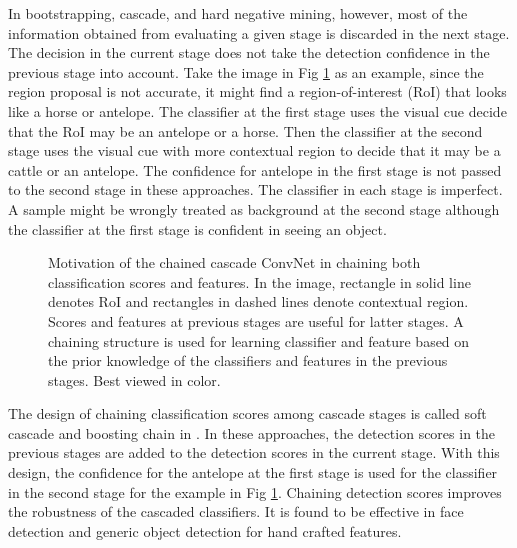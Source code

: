 \documentclass[10pt,twocolumn,letterpaper]{article}
\begin{document}
In bootstrapping, cascade, and hard negative mining, however, most of the information obtained from evaluating a given stage is discarded in the next stage. The decision in the current stage does not take the detection confidence in the previous stage into account. Take the image in Fig \ref{fig:overview} as an example, since the region proposal is not accurate, it might find a region-of-interest (RoI) that looks like a horse or antelope. The classifier at the first stage uses the visual cue decide that the RoI may be an antelope or a horse. Then the classifier at the second stage uses the visual cue with more contextual region to decide that it may be a cattle or an antelope. The confidence for antelope in the first stage is not  passed to the second stage in these  approaches. The classifier in each stage is imperfect. A sample might be wrongly treated as background at the second stage although the classifier at the first stage is confident in seeing an object.

\begin{figure}
\begin{center}
\centerline{}
\end{center}
\vspace{-10pt}
   \caption{Motivation of the chained cascade ConvNet in chaining both classification scores and features. In the image, rectangle  in solid line denotes RoI and rectangles in dashed lines denote contextual region. Scores and features at previous stages are useful for latter stages. A chaining structure is used for learning classifier and feature based on the prior knowledge of the classifiers and features in the previous stages. Best viewed in color.}
\label{fig:overview}
\end{figure}

The design of chaining classification scores among cascade stages is called soft cascade \cite{bourdev2005robust} and boosting chain in \cite{xiao2003boosting}. In these approaches, the detection scores in the previous stages are added to the detection scores in the current stage. With this design, the confidence for the antelope at the first stage is used for the classifier in the second stage for the example in Fig \ref{fig:overview}. Chaining detection scores improves the robustness of the cascaded classifiers.
It is found to be effective in face detection \cite{bourdev2005robust, xiao2003boosting} and generic object detection \cite{Pedersoli:C2FObj2, Felzenszwalb:cascade10} for hand crafted features. 
\end{document}
